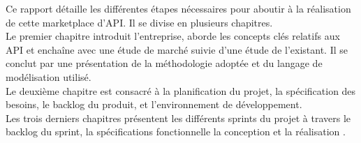 Ce rapport détaille les différentes étapes nécessaires pour aboutir à la réalisation de cette marketplace d’API. Il se divise en plusieurs chapitres.\\ 
Le premier chapitre introduit l'entreprise, aborde les concepts clés relatifs aux API et enchaîne avec une étude de marché suivie d'une étude de l'existant. Il se conclut par une présentation de la méthodologie adoptée et du langage de modélisation utilisé. \\
Le deuxième chapitre est consacré à la planification du projet, la spécification des besoins, le backlog du produit, et l'environnement de développement. \\ 
Les trois derniers chapitres présentent les différents sprints du projet à travers le backlog du sprint, la spécifications fonctionnelle la conception et la réalisation .